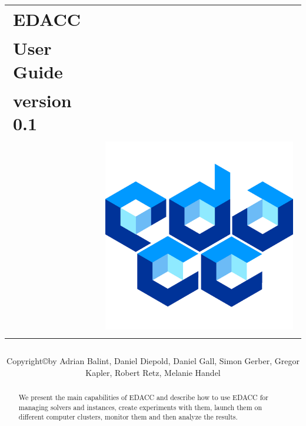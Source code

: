 \documentclass[twoside,a4paper]{refart}
\title{
\begin{tabular}{>{\raggedright}m{4cm}>{\raggedleft}m{10cm}}
EDACC \\User Guide \\version 0.1\\ & \includegraphics[scale=0.3]{edacclogo.jpg}
\end{tabular}
}
\author{Copyright\copyright by  Adrian Balint, Daniel Diepold, Daniel Gall, Simon Gerber, Gregor Kapler, Robert Retz, Melanie Handel}
\date{}
\theoremstyle{dotless}
\newcounter{ex}
\newcommand{\Eexample}{\color{green}Example \arabic{ex}:  \addtocounter{ex}{1}}
\begin{document}
\maketitle



\begin{abstract}
        We present the main capabilities of EDACC and describe how to use EDACC for managing solvers and instances, create experiments with them, launch them on different computer clusters, monitor them and then analyze the results. 
\end{abstract}



\tableofcontents

\newpage

\end{document}
